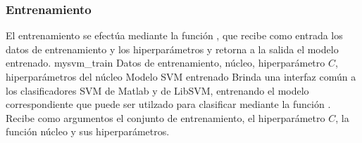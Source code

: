 %
\subsubsection{Entrenamiento}
%
El entrenamiento se efectúa mediante la función ,
que recibe como entrada los datos de entrenamiento y los
hiperparámetros y retorna a la salida el modelo entrenado.
%
\funcentry
    {mysvm\_train}
    {Datos de entrenamiento, núcleo, hiperparámetro $C$,
      hiperparámetros del núcleo}
    {Modelo SVM entrenado}
    {Brinda una interfaz común a los clasificadores SVM de Matlab
      y de LibSVM, entrenando el modelo correspondiente que puede
      ser utilzado para clasificar mediante la función
      .
      Recibe como argumentos el conjunto de entrenamiento,
      el hiperparámetro $C$, la función núcleo y sus
      hiperparámetros.}
